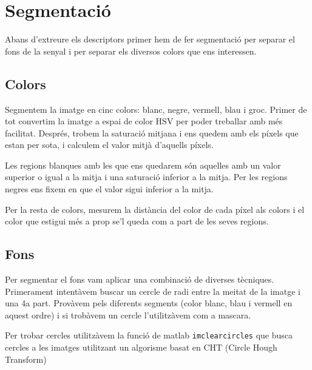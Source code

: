 
%



\section{Segmentació}%
\label{sec:segmentacio}

Abans d'extreure els descriptors primer hem de fer segmentació per separar el fons de la
senyal i per separar els diversos colors que ens interessen.

\subsection{Colors}

Segmentem la imatge en cinc colors: blanc, negre, vermell, blau i groc.
Primer de tot convertim la imatge a espai de color HSV per poder treballar amb més
facilitat. Després, trobem la saturació mitjana i ens quedem amb els píxels que
estan per sota, i calculem el valor mitjà d'aquells píxels.

Les regions blanques
amb les que ens quedarem són aquelles amb un valor superior o igual a la mitja i una
saturació inferior a la mitja. Per les regions negres ens fixem en que el valor
sigui inferior a la mitja.

Per la resta de colors, mesurem la distància del color de
cada píxel als colors i el color que estigui més a prop se'l queda com a part de les
seves regions.

\subsection{Fons}%
\label{sub:seg_fons}

Per segmentar el fons vam aplicar una combinació de diverses tècniques.
Primerament intentàvem buscar un cercle de radi entre la meitat de la imatge i
una 4a part. Provàvem pels diferents segments (color blanc, blau i vermell en
aquest ordre) i si trobàvem un cercle l'utilitzàvem com a mascara.

Per trobar cercles utilitzàvem la funció de matlab \texttt{imclearcircles} que
busca cercles a les imatges utilitzant un algorisme basat en CHT (Circle Hough
Transform)

